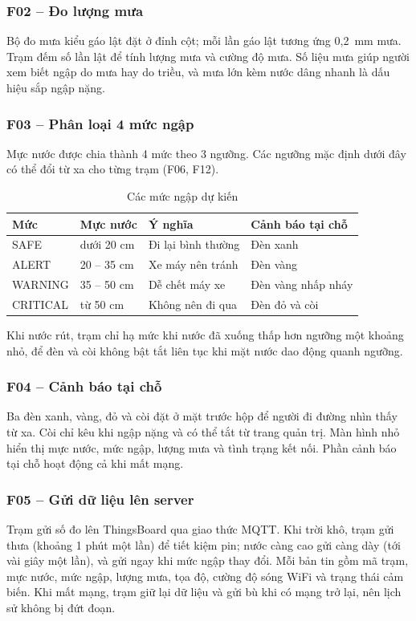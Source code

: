 \documentclass[12pt,a4paper]{article}
\begin{document}
\subsubsection{F02 -- Đo lượng mưa}\label{sec:f02}
Bộ đo mưa kiểu gáo lật đặt ở đỉnh cột; mỗi lần gáo lật tương ứng 0,2~mm mưa. Trạm đếm số lần lật để tính lượng mưa và cường độ mưa. Số liệu mưa giúp người xem biết ngập do mưa hay do triều, và mưa lớn kèm nước dâng nhanh là dấu hiệu sắp ngập nặng.

\subsubsection{F03 -- Phân loại 4 mức ngập}\label{sec:f03}
Mực nước được chia thành 4 mức theo 3 ngưỡng. Các ngưỡng mặc định dưới đây có thể đổi từ xa cho từng trạm (F06, F12).

\begin{table}[H]
\centering
\caption{Các mức ngập dự kiến}
\label{tab:levels}
\renewcommand{\arraystretch}{1.3}
\begin{tabular}{|L{2.4cm}|C{2.8cm}|L{4.2cm}|L{4.6cm}|}
\hline
{}\textbf{Mức} & \textbf{Mực nước} & \textbf{Ý nghĩa} & \textbf{Cảnh báo tại chỗ} \\ \hline
SAFE & dưới 20 cm & Đi lại bình thường & Đèn xanh \\ \hline
ALERT & 20 -- 35 cm & Xe máy nên tránh & Đèn vàng \\ \hline
WARNING & 35 -- 50 cm & Dễ chết máy xe & Đèn vàng nhấp nháy \\ \hline
CRITICAL & từ 50 cm & Không nên đi qua & Đèn đỏ và còi \\ \hline
\end{tabular}
\end{table}

Khi nước rút, trạm chỉ hạ mức khi nước đã xuống thấp hơn ngưỡng một khoảng nhỏ, để đèn và còi không bật tắt liên tục khi mặt nước dao động quanh ngưỡng.

\subsubsection{F04 -- Cảnh báo tại chỗ}\label{sec:f04}
Ba đèn xanh, vàng, đỏ và còi đặt ở mặt trước hộp để người đi đường nhìn thấy từ xa. Còi chỉ kêu khi ngập nặng và có thể tắt từ trang quản trị. Màn hình nhỏ hiển thị mực nước, mức ngập, lượng mưa và tình trạng kết nối. Phần cảnh báo tại chỗ hoạt động cả khi mất mạng.

\subsubsection{F05 -- Gửi dữ liệu lên server}\label{sec:f05}
Trạm gửi số đo lên ThingsBoard qua giao thức MQTT. Khi trời khô, trạm gửi thưa (khoảng 1 phút một lần) để tiết kiệm pin; nước càng cao gửi càng dày (tới vài giây một lần), và gửi ngay khi mức ngập thay đổi. Mỗi bản tin gồm mã trạm, mực nước, mức ngập, lượng mưa, tọa độ, cường độ sóng WiFi và trạng thái cảm biến. Khi mất mạng, trạm giữ lại dữ liệu và gửi bù khi có mạng trở lại, nên lịch sử không bị đứt đoạn.
\end{document}
